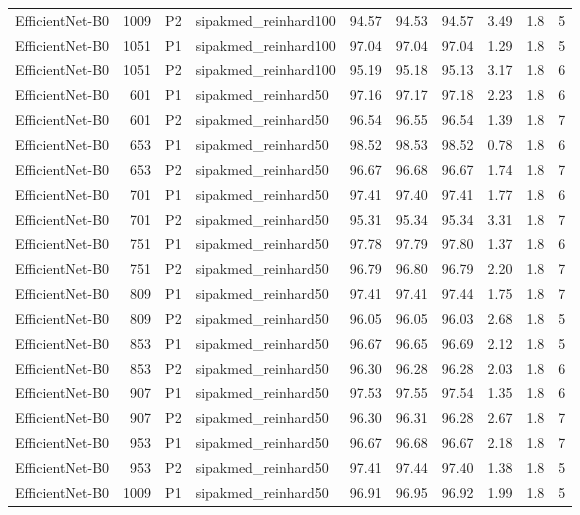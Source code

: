 {\begin{longtable}{lrllrrrrrr}
EfficientNet-B0 & 1009 & P2 & sipakmed\_reinhard100 & 94.57 & 94.53 & 94.57 & 3.49 & 1.8 & 5 \\
EfficientNet-B0 & 1051 & P1 & sipakmed\_reinhard100 & 97.04 & 97.04 & 97.04 & 1.29 & 1.8 & 5 \\
EfficientNet-B0 & 1051 & P2 & sipakmed\_reinhard100 & 95.19 & 95.18 & 95.13 & 3.17 & 1.8 & 6 \\
EfficientNet-B0 & 601 & P1 & sipakmed\_reinhard50 & 97.16 & 97.17 & 97.18 & 2.23 & 1.8 & 6 \\
EfficientNet-B0 & 601 & P2 & sipakmed\_reinhard50 & 96.54 & 96.55 & 96.54 & 1.39 & 1.8 & 7 \\
EfficientNet-B0 & 653 & P1 & sipakmed\_reinhard50 & 98.52 & 98.53 & 98.52 & 0.78 & 1.8 & 6 \\
EfficientNet-B0 & 653 & P2 & sipakmed\_reinhard50 & 96.67 & 96.68 & 96.67 & 1.74 & 1.8 & 7 \\
EfficientNet-B0 & 701 & P1 & sipakmed\_reinhard50 & 97.41 & 97.40 & 97.41 & 1.77 & 1.8 & 6 \\
EfficientNet-B0 & 701 & P2 & sipakmed\_reinhard50 & 95.31 & 95.34 & 95.34 & 3.31 & 1.8 & 7 \\
EfficientNet-B0 & 751 & P1 & sipakmed\_reinhard50 & 97.78 & 97.79 & 97.80 & 1.37 & 1.8 & 6 \\
EfficientNet-B0 & 751 & P2 & sipakmed\_reinhard50 & 96.79 & 96.80 & 96.79 & 2.20 & 1.8 & 7 \\
EfficientNet-B0 & 809 & P1 & sipakmed\_reinhard50 & 97.41 & 97.41 & 97.44 & 1.75 & 1.8 & 7 \\
EfficientNet-B0 & 809 & P2 & sipakmed\_reinhard50 & 96.05 & 96.05 & 96.03 & 2.68 & 1.8 & 5 \\
EfficientNet-B0 & 853 & P1 & sipakmed\_reinhard50 & 96.67 & 96.65 & 96.69 & 2.12 & 1.8 & 5 \\
EfficientNet-B0 & 853 & P2 & sipakmed\_reinhard50 & 96.30 & 96.28 & 96.28 & 2.03 & 1.8 & 6 \\
EfficientNet-B0 & 907 & P1 & sipakmed\_reinhard50 & 97.53 & 97.55 & 97.54 & 1.35 & 1.8 & 6 \\
EfficientNet-B0 & 907 & P2 & sipakmed\_reinhard50 & 96.30 & 96.31 & 96.28 & 2.67 & 1.8 & 7 \\
EfficientNet-B0 & 953 & P1 & sipakmed\_reinhard50 & 96.67 & 96.68 & 96.67 & 2.18 & 1.8 & 7 \\
EfficientNet-B0 & 953 & P2 & sipakmed\_reinhard50 & 97.41 & 97.44 & 97.40 & 1.38 & 1.8 & 5 \\
EfficientNet-B0 & 1009 & P1 & sipakmed\_reinhard50 & 96.91 & 96.95 & 96.92 & 1.99 & 1.8 & 5 \\

\end{longtable}}
